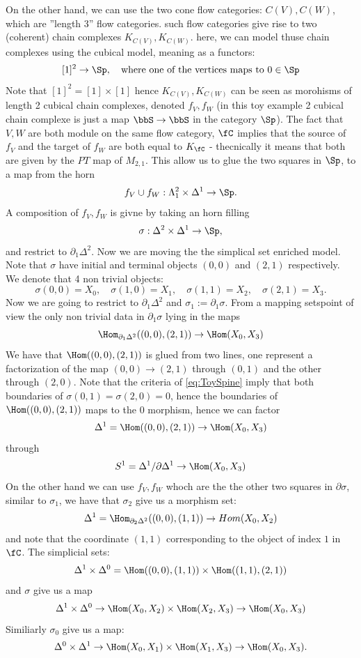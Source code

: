 On the other hand, we can use the two cone flow categories: $C(V), C(W)$, which are ''length 3'' flow categories. such flow categories give rise to two (coherent) chain complexes $K_{C(V)}, K_{C(W)}$.
here, we can model thuse chain complexes using the cubical model, meaning as a functors:
\begin{equation}\label{eq:ToySpine}
    [1]^2 \to \Sp, \quad \text{where one of the vertices maps to } 0 \in \Sp
\end{equation}
Note that  $[1]^2 = [1] \times [1]$ hence $K_{C(V)}, K_{C(W)}$ can be seen as morohisms of length 2 cubical chain complexes, denoted $f_V,f_W$ (in this toy example 2 cubical chain complexe is just a map $\bbS \to \bbS$ in the category $\Sp$).
The fact that $V,W$ are both module on the same flow category, $\fC$ implies that the source of $f_V$ and the target of $f_W$ are both equal to $K_\fC$ - thecnically it means that both are given by the $PT$ map of $M_{2,1}$.
This allow us to glue the two squares in $\Sp$, to a map from the horn
\[
    f_V \cup f_W : \Lambda^2_1 \times \Delta^1 \to \Sp.
\]
A composition of $f_V, f_W$ is givne by taking an horn filling
\[
    \sigma : \Delta^2 \times \Delta^1 \to \Sp,
\]
and restrict to $\partial_1 \Delta^2$. Now we are moving the the simplical set enriched model.
Note that $\sigma$ have initial and terminal objects $(0,0)$ and $(2,1)$ respectively.
We denote that 4 non trivial objects:
\[
    \sigma(0,0) = X_0, \quad \sigma(1,0) = X_1, \quad \sigma(1,1) = X_2, \quad \sigma(2,1) = X_3.
\]
Now we are going to restrict to $\partial_1 \Delta^2$ and $\sigma_1 :=  \partial_1 \sigma$.
From a mapping setspoint of view the only non trivial data in $\partial_1 \sigma$ lying in the maps 
\[
    \Hom_{\partial_1 \Delta^2}((0,0),(2,1)) \to \Hom(X_0,X_3)
\]
We have that $\Hom((0,0),(2,1))$ is glued from two lines, one represent a factorization of the map $(0,0) \to (2,1)$ through $(0,1)$ and the other through $(2,0)$. Note that the criteria of \cref{eq:ToySpine} imply that both boundaries of $\sigma(0,1) = \sigma(2,0) = 0$, hence the boundaries of $\Hom((0,0),(2,1))$ maps to the $0$ morphism, hence we can factor
\[
    \Delta^1 = \Hom((0,0),(2,1)) \to \Hom(X_0,X_3)
\]
through 
\[
    S^1 = \Delta^1/\partial \Delta^1 \to \Hom(X_0,X_3)
\]
On the other hand we can use $f_V,f_W$ whoch are the the other two squares in $\partial \sigma$, similar to $\sigma_1$, we have that $\sigma_2$ give us a morphism set:
\[
    \Delta^1 = \Hom_{\partial_2 \Delta^2}( (0,0), (1,1) ) \to Hom(X_0,X_2)
\]
and note that the coordinate $(1,1)$ corresponding to the object of index $1$ in $\fC$.
The simplicial sets:
\[
    \Delta^1 \times \Delta^0 = \Hom((0,0),(1,1)) \times \Hom((1,1),(2,1)) 
\]
and $\sigma$ give us a map
\[
    \Delta^1 \times \Delta^0 \to \Hom(X_0,X_2) \times \Hom(X_2,X_3) \to \Hom(X_0,X_3)
\]
Similiarly $\sigma_0$ give us a map:
\[
    \Delta^0 \times \Delta^1 \to \Hom(X_0,X_1) \times \Hom(X_1,X_3) \to \Hom(X_0,X_3).
\]

